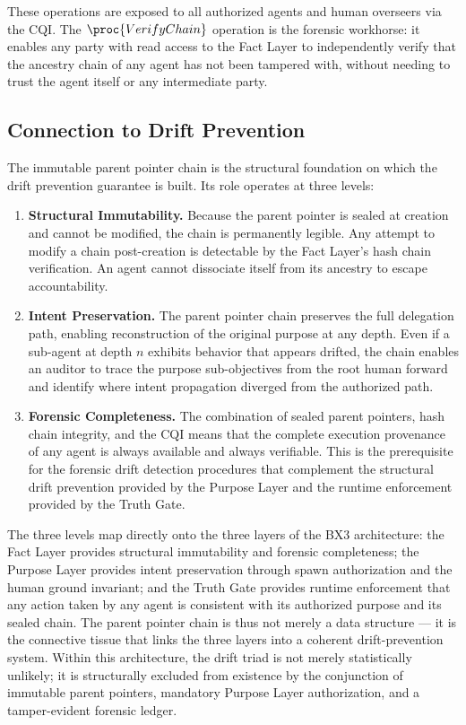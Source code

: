 These operations are exposed to all authorized agents and human overseers via the CQI. The $\proc{VerifyChain}$ operation is the forensic workhorse: it enables any party with read access to the Fact Layer to independently verify that the ancestry chain of any agent has not been tampered with, without needing to trust the agent itself or any intermediate party.

\subsection{Connection to Drift Prevention}

The immutable parent pointer chain is the structural foundation on which the drift prevention guarantee is built. Its role operates at three levels:

\begin{enumerate}
    \item \textbf{Structural Immutability.} Because the parent pointer is sealed at creation and cannot be modified, the chain is permanently legible. Any attempt to modify a chain post-creation is detectable by the Fact Layer's hash chain verification. An agent cannot dissociate itself from its ancestry to escape accountability.

    \item \textbf{Intent Preservation.} The parent pointer chain preserves the full delegation path, enabling reconstruction of the original purpose at any depth. Even if a sub-agent at depth $n$ exhibits behavior that appears drifted, the chain enables an auditor to trace the purpose sub-objectives from the root human forward and identify where intent propagation diverged from the authorized path.

    \item \textbf{Forensic Completeness.} The combination of sealed parent pointers, hash chain integrity, and the CQI means that the complete execution provenance of any agent is always available and always verifiable. This is the prerequisite for the forensic drift detection procedures that complement the structural drift prevention provided by the Purpose Layer and the runtime enforcement provided by the Truth Gate.
\end{enumerate}

The three levels map directly onto the three layers of the BX3 architecture: the Fact Layer provides structural immutability and forensic completeness; the Purpose Layer provides intent preservation through spawn authorization and the human ground invariant; and the Truth Gate provides runtime enforcement that any action taken by any agent is consistent with its authorized purpose and its sealed chain. The parent pointer chain is thus not merely a data structure — it is the connective tissue that links the three layers into a coherent drift-prevention system. Within this architecture, the drift triad is not merely statistically unlikely; it is structurally excluded from existence by the conjunction of immutable parent pointers, mandatory Purpose Layer authorization, and a tamper-evident forensic ledger.